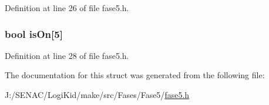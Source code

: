 Definition at line 26 of file fase5.\-h.

\hypertarget{struct_level_cinco_a59f6fe985ed5513f62660b2926c812aa}{
\subsubsection[{is\-On}]{\setlength{\rightskip}{0pt plus 5cm}bool is\-On\mbox{[}5\mbox{]}}}\label{struct_level_cinco_a59f6fe985ed5513f62660b2926c812aa}


Definition at line 28 of file fase5.\-h.



The documentation for this struct was generated from the following file\-:\begin{DoxyCompactItemize}
\item 
J\-:/\-S\-E\-N\-A\-C/\-Logi\-Kid/make/src/\-Fases/\-Fase5/\hyperlink{fase5_8h}{fase5.\-h}\end{DoxyCompactItemize}
